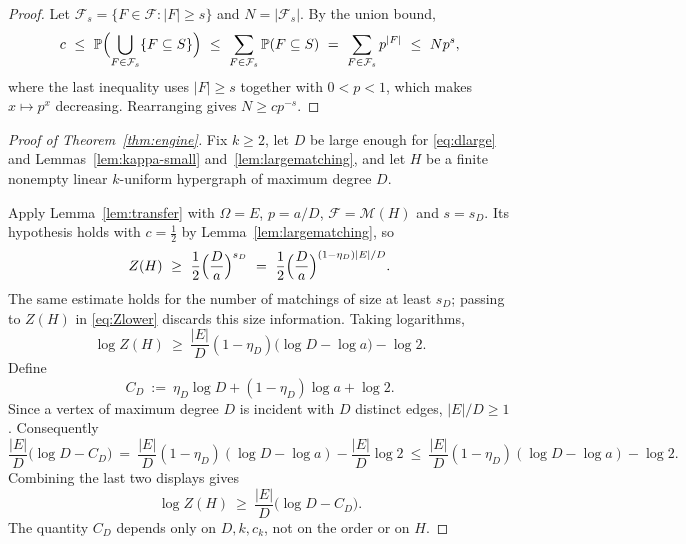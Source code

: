 \documentclass[11pt,a4paper]{amsart}
\theoremstyle{plain}
\theoremstyle{definition}
\theoremstyle{remark}
\newcommand{\EE}{E}
\newcommand{\Mat}{\mathcal{M}}
\newcommand{\PP}{\mathbb{P}}
\begin{document}
\begin{proof}
Let $\mathcal{F}_s=\{F\in\mathcal{F}:|F|\ge s\}$ and $N=|\mathcal{F}_s|$. By the union
bound,
\[
  c\ \le\ \PP\Bigl(\bigcup_{F\in\mathcal{F}_s}\{F\subseteq S\}\Bigr)
  \ \le\ \sum_{F\in\mathcal{F}_s}\PP(F\subseteq S)
  \ =\ \sum_{F\in\mathcal{F}_s}p^{|F|}
  \ \le\ N p^{s},
\]
where the last inequality uses $|F|\ge s$ together with $0<p<1$, which makes
$x\mapsto p^{x}$ decreasing. Rearranging gives $N\ge cp^{-s}$.
\end{proof}

\begin{proof}[Proof of Theorem~\ref{thm:engine}]
Fix $k\ge2$, let $D$ be large enough for \eqref{eq:dlarge} and
Lemmas~\ref{lem:kappa-small} and~\ref{lem:largematching}, and let $H$ be a finite
nonempty linear $k$-uniform hypergraph of maximum degree $D$.

Apply Lemma~\ref{lem:transfer} with $\Omega=\EE$, $p=a/D$, $\mathcal{F}=\Mat(H)$ and
$s=s_D$. Its hypothesis holds with $c=\tfrac12$ by Lemma~\ref{lem:largematching}, so
\begin{equation}
\label{eq:Zlower}
  Z(H)\ \ge\ \frac12\Bigl(\frac{D}{a}\Bigr)^{s_D}
  \ =\ \frac12\Bigl(\frac{D}{a}\Bigr)^{(1-\eta_D)|\EE|/D}.
\end{equation}
The same estimate holds for the number of matchings of size at least $s_D$;
passing to $Z(H)$ in \eqref{eq:Zlower} discards this size information.
Taking logarithms,
\[
  \log Z(H)\ \ge\ \frac{|\EE|}{D}(1-\eta_D)\bigl(\log D-\log a\bigr)-\log 2 .
\]
Define
\begin{equation}
\label{eq:Cd}
  C_D\ :=\ \eta_D\log D+(1-\eta_D)\log a+\log 2 .
\end{equation}
Since a vertex of maximum degree $D$ is incident with $D$ distinct edges,
$|\EE|/D\ge1$. Consequently
\[
  \frac{|\EE|}{D}\bigl(\log D-C_D\bigr)
  \ =\ \frac{|\EE|}{D}(1-\eta_D)(\log D-\log a)
       -\frac{|\EE|}{D}\log2
  \ \le\ \frac{|\EE|}{D}(1-\eta_D)(\log D-\log a)-\log 2.
\]
Combining the last two displays gives
\begin{equation}
\label{eq:engine}
  \log Z(H)\ \ge\ \frac{|\EE|}{D}\bigl(\log D-C_D\bigr).
\end{equation}
The quantity $C_D$ depends only on $D,k,c_k$, not on the order or on $H$.


\end{proof}
\end{document}
